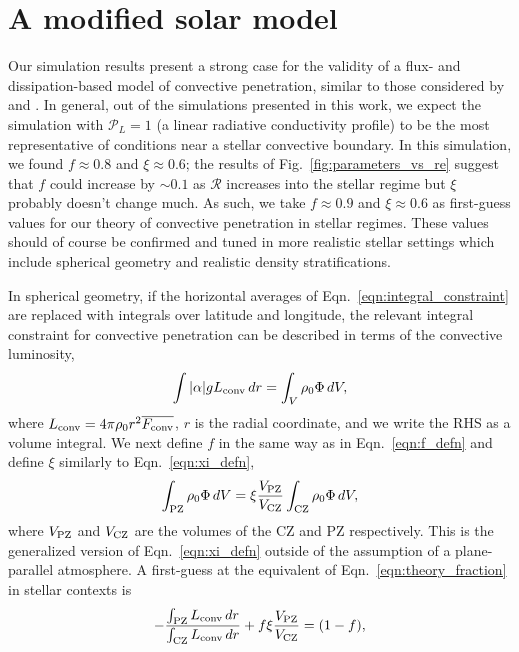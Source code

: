 \documentclass[twocolumn]{aastex631}
\newcommand{\mP}{\ensuremath{\mathcal{P}}}
\newcommand{\mR}{\ensuremath{\mathcal{R}}}
\renewcommand{\bar}[1]{\overline{#1}}
\begin{document}
\section{A modified solar model}
\label{sec:solar_model}
Our simulation results present a strong case for the validity of a flux- and dissipation-based model of convective penetration, similar to those considered by \citet{zahn1991} and \citet{roxburgh1989}.
In general, out of the simulations presented in this work, we expect the simulation with $\mP_L = 1$ (a linear radiative conductivity profile) to be the most representative of conditions near a stellar convective boundary.
In this simulation, we found $f \approx 0.8$ and $\xi \approx 0.6$; the results of Fig.~\ref{fig:parameters_vs_re} suggest that $f$ could increase by $\sim 0.1$ as $\mR$ increases into the stellar regime but $\xi$ probably doesn't change much.
As such, we take $f \approx 0.9$ and $\xi \approx 0.6$ as first-guess values for our theory of convective penetration in stellar regimes.
These values should of course be confirmed and tuned in more realistic stellar settings which include spherical geometry and realistic density stratifications.

In spherical geometry, if the horizontal averages of Eqn.~\ref{eqn:integral_constraint} are replaced with integrals over latitude and longitude, the relevant integral constraint for convective penetration can be described in terms of the convective luminosity,
\begin{equation}
\int |\alpha| g L_{\rm{conv}}\,dr =   \int_V \rho_0 \Phi\,dV,
\end{equation}
where $L_{\rm{conv}} = 4\pi\rho_0 r^2 \bar{F_{\rm{conv}}}$, $r$ is the radial coordinate, and we write the RHS as a volume integral.
We next define $f$ in the same way as in Eqn.~\ref{eqn:f_defn} and define $\xi$ similarly to Eqn.~\ref{eqn:xi_defn},
\begin{equation}
\int_{\rm{PZ}} \rho_0 \Phi \,dV = \xi \frac{V_{\rm{PZ}}}{V_{\rm{CZ}}}\int_{\rm{CZ}}\rho_0 \Phi \, dV,
\end{equation}
where $V_{\rm{PZ}}$ and $V_{\rm{CZ}}$ are the volumes of the CZ and PZ respectively.
This is the generalized version of Eqn.~\ref{eqn:xi_defn} outside of the assumption of a plane-parallel atmosphere.
A first-guess at the equivalent of Eqn.~\ref{eqn:theory_fraction} in stellar contexts is
\begin{equation}
-\frac{\int_{\rm{PZ}} L_{\rm{conv}}\,dr}{\int_{\rm{CZ}} L_{\rm{conv}}\,dr} + f \xi \frac{V_{\rm{PZ}}}{V_{\rm{CZ}}} = (1 - f),
\label{eqn:mesa_eqn}
\end{equation}
\end{document}
